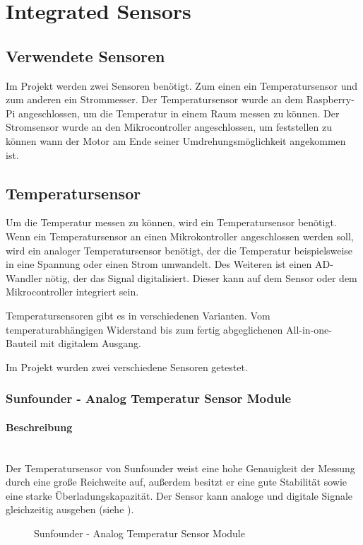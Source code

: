 \section{Integrated Sensors}\label{Sensors}
\subsection{Verwendete Sensoren}
Im Projekt werden zwei Sensoren benötigt. Zum einen ein Temperatursensor und zum anderen ein Strommesser. Der Temperatursensor wurde an dem Raspberry-Pi angeschlossen, um die Temperatur in einem Raum messen zu können.
Der Stromsensor wurde an den Mikrocontroller angeschlossen, um feststellen zu können wann der Motor am Ende seiner Umdrehungsmöglichkeit angekommen ist.

\subsection{Temperatursensor}
Um die Temperatur messen zu können, wird ein Temperatursensor benötigt. Wenn ein Temperatursensor an einen Mikrokontroller angeschlossen werden soll, wird ein analoger Temperatursensor benötigt, der die Temperatur beispielsweise in eine Spannung oder einen Strom umwandelt. Des Weiteren ist einen AD-Wandler nötig, der das Signal digitalisiert. Dieser kann auf dem Sensor oder dem Mikrocontroller integriert sein.

Temperatursensoren gibt es in verschiedenen Varianten. Vom temperaturabhängigen Widerstand bis zum fertig abgeglichenen All-in-one-Bauteil mit digitalem Ausgang.

Im Projekt wurden zwei verschiedene Sensoren getestet.

\subsubsection{Sunfounder - Analog Temperatur Sensor Module}
\paragraph{Beschreibung}\mbox{}\\
Der Temperatursensor von Sunfounder weist eine hohe Genauigkeit der Messung durch eine große Reichweite auf, außerdem besitzt er eine gute Stabilität sowie eine starke Überladungskapazität. Der Sensor kann analoge und digitale Signale gleichzeitig ausgeben (siehe ).

\begin{figure}[H]
\centering
{}
\caption{Sunfounder - Analog Temperatur Sensor Module}
\label{fig:sensors1}
\end{figure}

